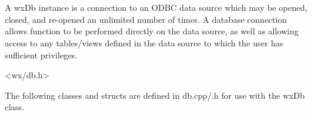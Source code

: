 \section{}\label{wxdb}

A wxDb instance is a connection to an ODBC data source which may
be opened, closed, and re-opened an unlimited number of times.  A
database connection allows function to be performed directly on the
data source, as well as allowing access to any tables/views defined in
the data source to which the user has sufficient privileges.


<wx/db.h>


The following classes and structs are defined in db.cpp/.h for use with the wxDb class.
